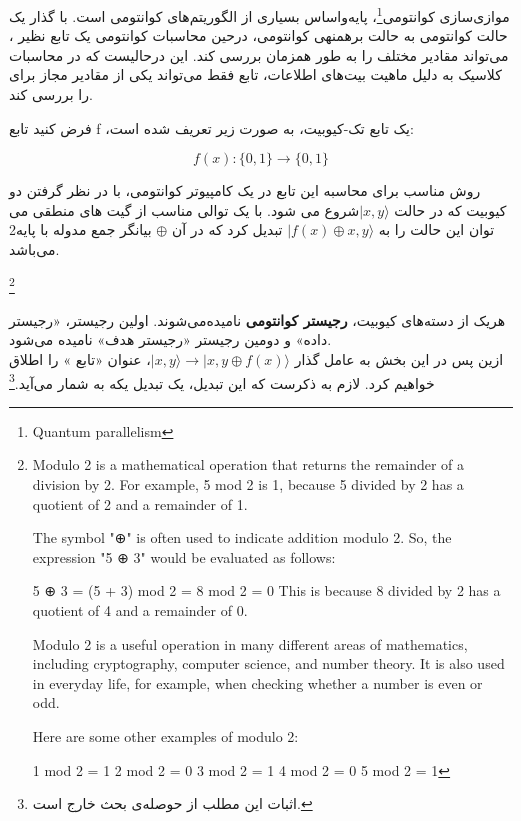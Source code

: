 \documentclass{book}
\begin{document}
موازی‌سازی کوانتومی\footnote{Quantum parallelism}، پایه‌واساس بسیاری از الگوریتم‌های کوانتومی است. با گذار یک حالت کوانتومی به حالت برهمنهی کوانتومی، درحین محاسبات کوانتومی یک تابع نظیر ، می‌تواند مقادیر مختلف  را به طور همزمان بررسی کند. این درحالیست که در محاسبات کلاسیک به دلیل ماهیت بیت‌های اطلاعات، تابع  فقط می‌تواند یکی از مقادیر مجاز برای  را بررسی کند.


فرض کنید تابع f ،یک تابع تک-کیوبیت، به صورت زیر تعریف شده است:\\
\begin{center}
\begin{equation}
f (x) : \{0, 1\} \rightarrow \{0, 1\}
\end{equation}
\end{center}

روش مناسب برای محاسبه این تابع در یک کامپیوتر کوانتومی، با در نظر گرفتن دو کیوبیت که در حالت $\vert x, y\rangle$شروع می شود. با یک توالی مناسب از گیت های منطقی می توان این حالت را به $\vert f(x) \oplus x, y\rangle$ تبدیل کرد که در آن $\oplus$ بیانگر جمع مدوله با پایه‌2 می‌باشد.

\footnote{Modulo 2 is a mathematical operation that returns the remainder of a division by 2. For example, 5 mod 2 is 1, because 5 divided by 2 has a quotient of 2 and a remainder of 1.
	
	The symbol "⊕" is often used to indicate addition modulo 2. So, the expression "5 ⊕ 3" would be evaluated as follows:
	
	5 ⊕ 3 = (5 + 3) mod 2 = 8 mod 2 = 0
	This is because 8 divided by 2 has a quotient of 4 and a remainder of 0.
	
	Modulo 2 is a useful operation in many different areas of mathematics, including cryptography, computer science, and number theory. It is also used in everyday life, for example, when checking whether a number is even or odd.
	
	Here are some other examples of modulo 2:
	
	1 mod 2 = 1
	2 mod 2 = 0
	3 mod 2 = 1
	4 mod 2 = 0
	5 mod 2 = 1}

هریک از دسته‌های کیوبیت، \textbf{رجیستر کوانتومی} نامیده‌می‌شوند. اولین رجیستر، «رجیستر داده» و دومین رجیستر «رجیستر هدف» نامیده می‌شود.\\
ازین پس در این بخش به عامل گذار $\vert x, y \rangle \rightarrow \vert x, y \oplus f(x) \rangle$، عنوان «تابع » را اطلاق خواهیم کرد. لازم به ذکرست که این تبدیل، یک تبدیل یکه به شمار می‌آید.\footnote{اثبات این مطلب از حوصله‌ی بحث خارج است.}
\end{document}
